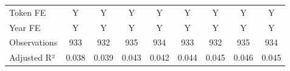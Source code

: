 {\begin{tabular}{l*{8}{c}}
\midrule
Token FE            &           Y         &           Y         &           Y         &           Y         &           Y         &           Y         &           Y         &           Y         \\
Year FE             &           Y         &           Y         &           Y         &           Y         &           Y         &           Y         &           Y         &           Y         \\
Observations        &         933         &         932         &         935         &         934         &         933         &         932         &         935         &         934         \\
Adjusted R²         &       0.038         &       0.039         &       0.043         &       0.042         &       0.044         &       0.045         &       0.046         &       0.045         \\
\bottomrule
\end{tabular}
}
